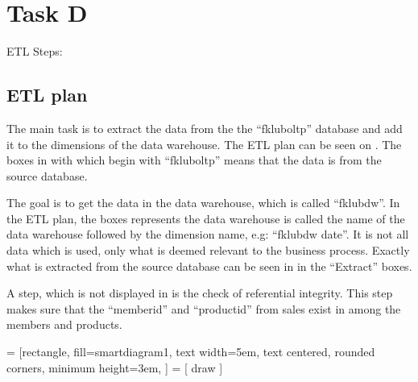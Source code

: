 \section{Task D}

ETL Steps:

\subsection{ETL plan}
The main task is to extract the data from the the ``fkluboltp'' database and add it to the dimensions of the data warehouse.
The ETL plan can be seen on . 
The boxes in  with which begin with ``fkluboltp'' means that the data is from the source database. 

The goal is to get the data in the data warehouse, which is called ``fklubdw''. 
In the ETL plan, the boxes represents the data warehouse is called the name of the data warehouse followed by the dimension name, e.g: ``fklubdw date''.
It is not all data which is used, only what is deemed relevant to the business process.
Exactly what is extracted from the source database can be seen in  in the ``Extract'' boxes. 

A step, which is not displayed in  is the check of referential integrity.
This step makes sure that the ``memberid'' and ``productid'' from sales exist in among the members and products. 

 = [rectangle,
    fill=smartdiagram1,
    text width=5em,
    text centered,
    rounded corners,
    minimum height=3em,
]
 = [
    draw
]

